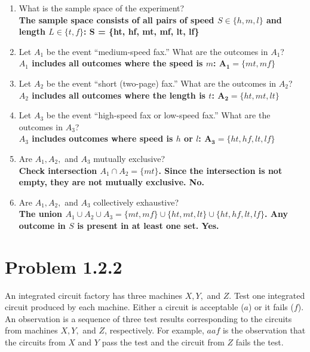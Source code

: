 \documentclass{article}
\begin{document}
\begin{enumerate}[label=(\alph*)]
    \item What is the sample space of the experiment? \\
    {\boldmath\textbf{The sample space consists of all pairs of speed $S \in \{h, m, l\}$ and length $L \in \{t, f\}$: S = \{ht, hf, mt, mf, lt, lf\}}}
    
    \item Let $A_1$ be the event ``medium-speed fax.'' What are the outcomes in $A_1$? \\
    {\boldmath\textbf{$A_1$ includes all outcomes where the speed is $m$: $\mathbf{A_1} = \{mt, mf\}$}}
    
    \item Let $A_2$ be the event ``short (two-page) fax.'' What are the outcomes in $A_2$? \\
    {\boldmath\textbf{$A_2$ includes all outcomes where the length is $t$: $\mathbf{A_2} = \{ht, mt, lt\}$}}
    
    \item Let $A_3$ be the event ``high-speed fax or low-speed fax.'' What are the outcomes in $A_3$? \\
    {\boldmath\textbf{$A_3$ includes outcomes where speed is $h$ or $l$: $\mathbf{A_3} = \{ht, hf, lt, lf\}$}}
    
    \item Are $A_1, A_2,$ and $A_3$ mutually exclusive? \\
    {\boldmath\textbf{Check intersection $A_1 \cap A_2 = \{mt\}$. Since the intersection is not empty, they are not mutually exclusive. No.}}
    
    \item Are $A_1, A_2,$ and $A_3$ collectively exhaustive? \\
    {\boldmath\textbf{The union $A_1 \cup A_2 \cup A_3 = \{mt, mf\} \cup \{ht, mt, lt\} \cup \{ht, hf, lt, lf\}$. Any outcome in $S$ is present in at least one set. Yes.}}
\end{enumerate}

\newpage

\section*{Problem 1.2.2}
An integrated circuit factory has three machines $X, Y,$ and $Z$. Test one integrated circuit produced by each machine. Either a circuit is acceptable ($a$) or it fails ($f$). An observation is a sequence of three test results corresponding to the circuits from machines $X, Y,$ and $Z$, respectively. For example, $aaf$ is the observation that the circuits from $X$ and $Y$ pass the test and the circuit from $Z$ fails the test.
\end{document}
